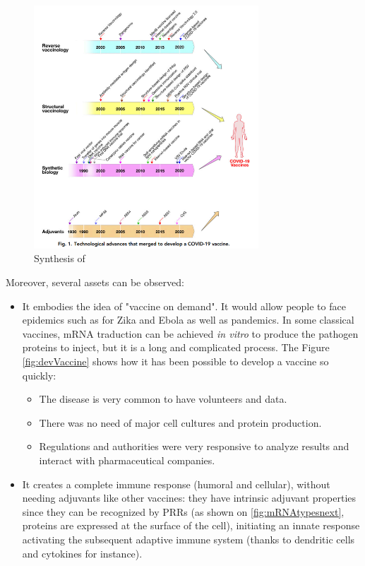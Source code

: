\documentclass{article}
\begin{document}
            \begin{figure}
                \centering
                \includegraphics[width=0.75\textwidth]{imgs/Revolution.PNG}
                \caption{Synthesis of \autocite{rappuoliVaccinologyPostCOVID192021}}
                \label{fig:revolution}
            \end{figure}

            Moreover, several assets can be observed:
            \begin{itemize}
                \item It embodies the idea of "vaccine on demand". It would allow people to face epidemics such as for Zika and Ebola as well as pandemics.
                    In some classical vaccines, mRNA traduction can be achieved \emph{in vitro} to produce the pathogen proteins to inject, but it is a long and complicated process.
                    The Figure \ref{fig:devVaccine} shows how it has been possible to develop a vaccine so quickly:
                        \begin{itemize}
                            \item The disease is very common to have volunteers and data.
                            \item There was no need of major cell cultures and protein production.
                            \item Regulations and authorities were very responsive to analyze results and interact with pharmaceutical companies.
                        \end{itemize}
                \item It creates a complete immune response (humoral and cellular), without needing adjuvants like other vaccines:
                    they have intrinsic adjuvant properties since they can be recognized by PRRs
                    (as shown on \ref{fig:mRNAtypesnext}, proteins are expressed at the surface of the cell), initiating an innate response activating
                    the subsequent adaptive immune system (thanks to dendritic cells and cytokines for instance).
            \end{itemize}
\end{document}
